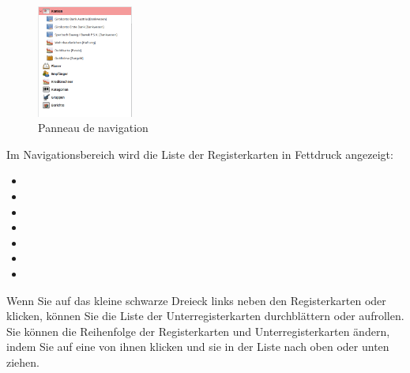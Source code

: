 \begin{figure}%
\vspace{-\intextsep}				%
\centering							%
\includegraphics[width=0.28\textwidth]{image/screenshot/home_navigation}
\vspace{-5pt}						%
\captionsetup{%
	format=plain,					%
	name=Fig.,						%
	justification=centering,		%
	labelsep=newline				%
}
\caption{Panneau de navigation}		%
\vspace{-40pt}						%
\label{home_navigation}
\end{figure}

Im Navigationsbereich wird die Liste der Registerkarten in Fettdruck angezeigt:
	\begin{itemize}
		\item {}%
		\item {}%
		\item {}%
		\item {}%
		\item {}%
		\item {}%
		\item {}%
	\end{itemize}
Wenn Sie auf das kleine schwarze Dreieck links neben den Registerkarten  oder  klicken, können Sie die Liste der Unterregisterkarten durchblättern oder aufrollen. Sie können die Reihenfolge der Registerkarten und Unterregisterkarten ändern, indem Sie auf eine von ihnen klicken und sie in der Liste nach oben oder unten ziehen.%

